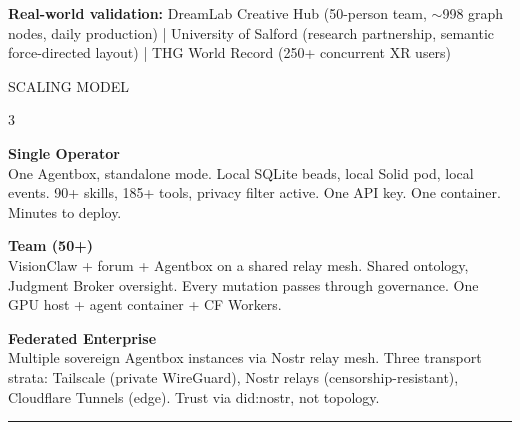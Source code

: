 \documentclass[10pt,a4paper]{article}
\newcommand{\sectiontag}[1]{%
  \vspace{6pt}%
  {\footnotesize\color{gold}\MakeUppercase{#1}}\\[-1pt]%
}
\newcommand{\accentrule}{\textcolor{cyan}{\rule{\linewidth}{0.5pt}}}
\begin{document}
\vspace{2pt}
{\small\textbf{Real-world validation:} DreamLab Creative Hub (50-person team, $\sim$998 graph nodes, daily production) | University of Salford (research partnership, semantic force-directed layout) | THG World Record (250+ concurrent XR users)}

\sectiontag{Scaling Model}

\begin{multicols}{3}
\raggedright

{\small
\textbf{\color{emerald}\faUser\;\;Single Operator}\\
One Agentbox, standalone mode. Local SQLite beads, local Solid pod, local events. 90+ skills, 185+ tools, privacy filter active. One API key. One container. Minutes to deploy.

\columnbreak

\textbf{\color{gold}\faUsers\;\;Team (50+)}\\
VisionClaw + forum + Agentbox on a shared relay mesh. Shared ontology, Judgment Broker oversight. Every mutation passes through governance. One GPU host + agent container + CF Workers.

\columnbreak

\textbf{\color{cyan}\faNetworkWired\;\;Federated Enterprise}\\
Multiple sovereign Agentbox instances via Nostr relay mesh. Three transport strata: Tailscale (private WireGuard), Nostr relays (censorship-resistant), Cloudflare Tunnels (edge). Trust via did:nostr, not topology.
}
\end{multicols}

\vspace{6pt}
\accentrule
\vspace{4pt}

\begin{center}
\end{center}

\end{document}
